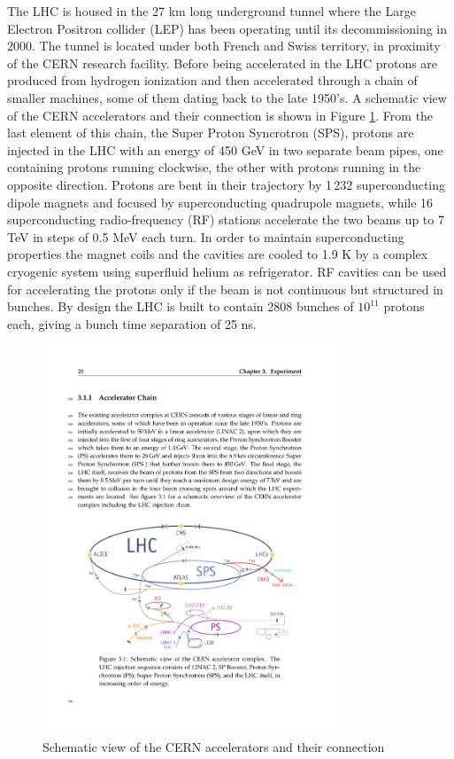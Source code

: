 The LHC is housed in the 27 km long underground tunnel where the Large Electron Positron collider (LEP) has been operating until its decommissioning in 2000. The tunnel is located under both French and Swiss territory, in proximity of the CERN research facility. Before being accelerated in the LHC protons are produced from hydrogen ionization and then accelerated through a chain of smaller machines, some of them dating back to the late 1950's. A schematic view of the CERN accelerators and their connection is shown in Figure \ref{fig:cern_accelerators}. From the last element of this chain, the Super Proton Syncrotron (SPS), protons are injected in the LHC with an energy of 450 GeV in two separate beam pipes, one containing protons running clockwise, the other with protons running in the opposite direction. Protons are bent in their trajectory by 1\,232 superconducting dipole magnets and focused by  superconducting quadrupole magnets, while 16 superconducting radio-frequency (RF) stations 
accelerate the two beams up to 7 TeV in steps of 0.5 MeV each turn. In order to maintain superconducting properties the magnet coils and the cavities are cooled to 1.9 K by a complex cryogenic system using superfluid helium as refrigerator. RF cavities can be used for accelerating the protons only if the beam is not continuous but structured in bunches. By design the LHC is built to contain 2808 bunches of $10^{11}$ protons each, giving a bunch time separation of 25 ns.

\begin{figure}
\begin{center}
\includegraphics[angle=-0,width=0.8\textwidth]{2_LHC_and_CMS/pics/LHC.pdf}
\caption{Schematic view of the CERN accelerators and their connection
\label{fig:cern_accelerators}
}
\end{center}
\end{figure}

